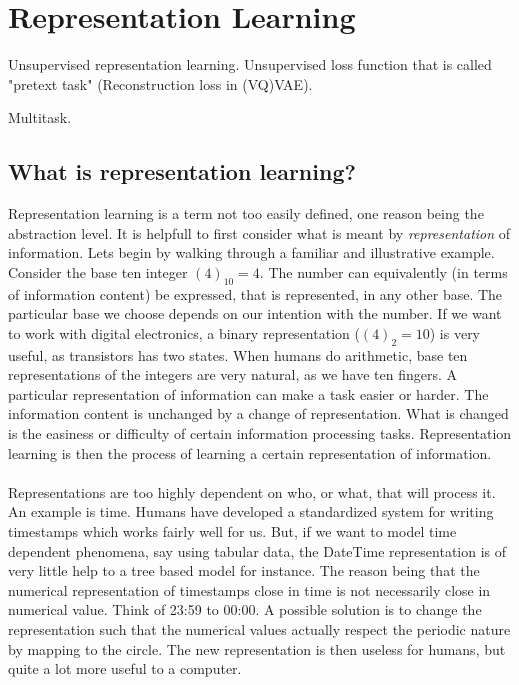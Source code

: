 \documentclass[../../thesis.tex]{subfiles}
\begin{document}
\section{Representation Learning}

Unsupervised representation learning. Unsupervised loss function that is called "pretext task" (Reconstruction loss in (VQ)VAE).  

Multitask.
\cite{Rep-rev-persp}

\subsection{What is representation learning?}
Representation learning is a term not too easily defined, one reason being the abstraction level. It is helpfull to first consider what is meant by \textit{representation} of information. Lets begin by walking through a familiar and illustrative example. Consider the base ten integer $(4)_{10} = 4$. The number can equivalently (in terms of information content) be expressed, that is represented, in any other base. The particular base we choose depends on our intention with the number. If we want to work with digital electronics, a binary representation ($(4)_{2} = 10$) is very useful, as transistors has two states. When humans do arithmetic, base ten representations of the integers are very natural, as we have ten fingers. A particular representation of information can make a task easier or harder. The information content is unchanged by a change of representation. What is changed is the easiness or difficulty of certain information processing tasks. Representation learning is then the process of learning a certain representation of information. \\\\

Representations are too highly dependent on who, or what, that will process it. An example is time. Humans have developed a standardized system for writing timestamps which works fairly well for us. But, if we want to model time dependent phenomena, say using tabular data, the DateTime representation is of very little help to a tree based model for instance. The reason being that the numerical representation of timestamps close in time is not necessarily close in numerical value. Think of 23:59 to 00:00. A possible solution is to change the representation such that the numerical values actually respect the periodic nature by mapping to the circle. The new representation is then useless for humans, but quite a lot more useful to a computer. \\\\
\end{document}
